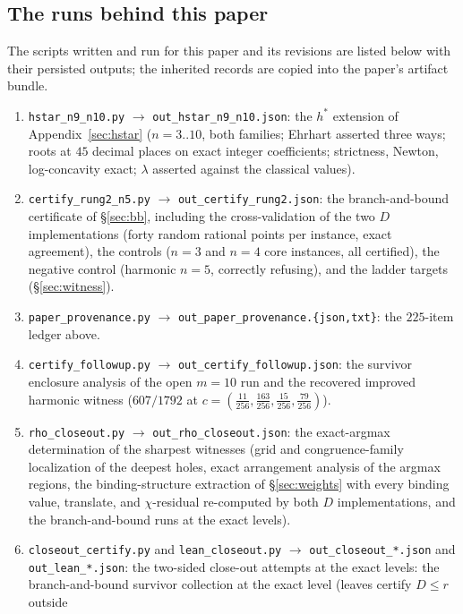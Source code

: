 \subsection{The runs behind this paper}

The scripts written and run for this paper and its revisions are listed
below with their persisted outputs; the inherited records are copied
into the paper's artifact bundle.

\begin{enumerate}[leftmargin=1.6em,itemsep=2pt]
\item \texttt{hstar\_n9\_n10.py} $\to$ \texttt{out\_hstar\_n9\_n10.json}:
the $h^*$ extension of Appendix~\ref{sec:hstar} ($n=3..10$, both
families; Ehrhart asserted three ways; roots at $45$ decimal places on
exact integer coefficients; strictness, Newton, log-concavity exact;
$\lambda$ asserted against the classical values).
\item \texttt{certify\_rung2\_n5.py} $\to$
\texttt{out\_certify\_rung2.json}: the branch-and-bound certificate of
\S\ref{sec:bb}, including the cross-validation of the two $D$
implementations (forty random rational points per instance, exact
agreement), the controls ($n=3$ and $n=4$ core instances, all
certified), the negative control (harmonic $n=5$, correctly refusing),
and the ladder targets (\S\ref{sec:witness}).
\item \texttt{paper\_provenance.py} $\to$
\texttt{out\_paper\_provenance.\{json,txt\}}: the $225$-item ledger
above.
\item \texttt{certify\_followup.py} $\to$
\texttt{out\_certify\_followup.json}: the survivor enclosure analysis
of the open $m=10$ run and the recovered improved harmonic witness
($607/1792$ at $c=(\tfrac{11}{256},\tfrac{163}{256},
\tfrac{15}{256},\tfrac{79}{256})$).
\item \texttt{rho\_closeout.py} $\to$ \texttt{out\_rho\_closeout.json}:
the exact-argmax determination of the sharpest witnesses (grid and
congruence-family localization of the deepest holes, exact arrangement
analysis of the argmax regions, the binding-structure extraction of
\S\ref{sec:weights} with every binding value, translate, and
$\chi$-residual re-computed by both $D$ implementations, and the
branch-and-bound runs at the exact levels).
\item {\sloppy\texttt{closeout\_certify.py} and \texttt{lean\_closeout.py} $\to$
\texttt{out\_closeout\_*.json} and \texttt{out\_lean\_*.json}: the
two-sided close-out attempts at the exact levels: the branch-and-bound
survivor collection at the exact level (leaves certify $D\le r$ outside
}
\end{enumerate}
